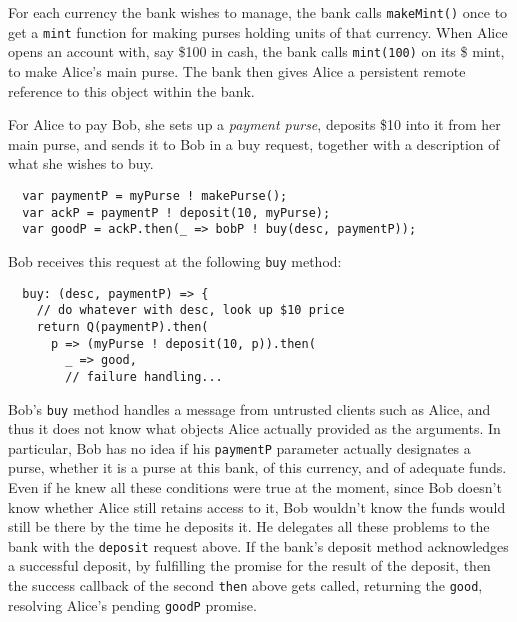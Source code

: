 \documentclass{llncs}
\begin{document}
For each currency the bank wishes to manage, the bank calls {\tt makeMint()} once to get a {\tt mint} function for making purses holding units of that currency. When Alice opens an account with, say \$100 in cash, the bank calls {\tt mint(100)} on its \$ mint, to make Alice's main purse. The bank then gives Alice a persistent remote reference to this object within the bank.

For Alice to pay Bob, she sets up a \emph{payment purse}, deposits \$10 into it from her main purse, and sends it to Bob in a buy request, together with a description of what she wishes to buy.
\begin{verbatim}
  var paymentP = myPurse ! makePurse();
  var ackP = paymentP ! deposit(10, myPurse);
  var goodP = ackP.then(_ => bobP ! buy(desc, paymentP));
\end{verbatim}


Bob receives this request at the following {\tt buy} method:
\begin{verbatim}
  buy: (desc, paymentP) => {
    // do whatever with desc, look up $10 price
    return Q(paymentP).then(
      p => (myPurse ! deposit(10, p)).then(
        _ => good,
        // failure handling...
\end{verbatim}

Bob's {\tt buy} method handles a message from untrusted clients such as Alice, and thus it does not know what objects Alice actually provided as the arguments. In particular, Bob has no idea if his {\tt paymentP} parameter actually designates a purse, whether it is a purse at this bank, of this currency, and of adequate funds. Even if he knew all these conditions were true at the moment, since Bob doesn't know whether Alice still retains access to it, Bob wouldn't know the funds would still be there by the time he deposits it. He delegates all these problems to the bank with the {\tt deposit} request above. If the bank's deposit method acknowledges a successful deposit, by fulfilling the promise for the result of the deposit, then the success callback of the second {\tt then} above gets called, returning the {\tt good}, resolving Alice's pending {\tt goodP} promise.
\end{document}
